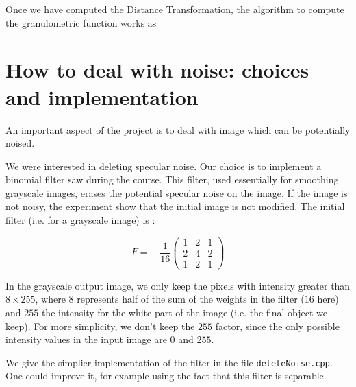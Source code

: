 Once we have computed the Distance Transformation, the algorithm to compute the granulometric function works as 

\section{How to deal with noise: choices and implementation}

An important aspect of the project is to deal with image which can be potentially noised.

We were interested in deleting specular noise. Our choice is to implement a binomial filter saw during the course. This filter, used essentially for smoothing grayscale images, erases the potential specular noise on the image. If the image is not noisy, the experiment show that the initial image is not modified. The initial filter (i.e. for a grayscale image) is :

\setcounter{MaxMatrixCols}{3}
\[ F = \quad \frac{1}{16} \begin{pmatrix}
1 & 2 & 1 \\
2 & 4 & 2 \\
1 & 2 & 1
\end{pmatrix}\]

In the grayscale output image, we only keep the pixels with intensity greater than $8 \times 255$, where $8$ represents half of the sum of the weights in the filter ($16$ here) and $255$ the intensity for the white part of the image (i.e. the final object we keep). For more simplicity, we don't keep the $255$ factor, since the only possible intensity values in the input image are $0$ and $255$.

We give the simplier implementation of the filter in the file \texttt{deleteNoise.cpp}. One could improve it, for example using the fact that this filter is separable.


